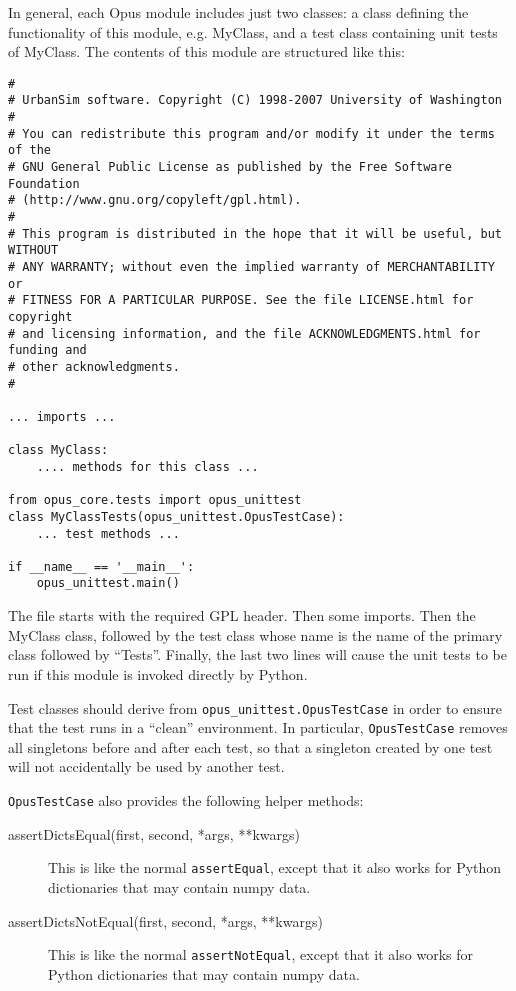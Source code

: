 In general, each Opus module includes just two classes: a class defining the
functionality of this module, e.g. MyClass, and a test class containing unit
tests of MyClass.  The contents of this module are structured like
this:

\begin{verbatim}
#
# UrbanSim software. Copyright (C) 1998-2007 University of Washington
#
# You can redistribute this program and/or modify it under the terms of the
# GNU General Public License as published by the Free Software Foundation
# (http://www.gnu.org/copyleft/gpl.html).
#
# This program is distributed in the hope that it will be useful, but WITHOUT
# ANY WARRANTY; without even the implied warranty of MERCHANTABILITY or
# FITNESS FOR A PARTICULAR PURPOSE. See the file LICENSE.html for copyright
# and licensing information, and the file ACKNOWLEDGMENTS.html for funding and
# other acknowledgments.
#

... imports ...

class MyClass:
    .... methods for this class ...

from opus_core.tests import opus_unittest
class MyClassTests(opus_unittest.OpusTestCase):
    ... test methods ...

if __name__ == '__main__':
    opus_unittest.main()
\end{verbatim}

The file starts with the required GPL header.  Then some imports.  Then the
MyClass class, followed by the test class whose name is the name of the primary
class followed by ``Tests''.  Finally, the last two lines will
cause the unit tests to be run if this module is invoked directly by Python.

Test classes should derive from \verb|opus_unittest.OpusTestCase| in order to 
ensure that the test runs in a ``clean'' environment.  In particular, 
\verb|OpusTestCase| removes all singletons before and after each test, so
that a singleton created by one test will not accidentally be used by another
test. 

\verb|OpusTestCase| also provides the following helper methods:

\begin{description}
  \item[assertDictsEqual(first, second, *args, **kwargs)] This is like the
  normal \verb|assertEqual|, except that it also works for Python dictionaries
  that may contain numpy data. 
  \item[assertDictsNotEqual(first, second, *args, **kwargs)] This is like the
  normal \verb|assertNotEqual|, except that it also works for Python
  dictionaries that may contain numpy data. 
\end{description}

